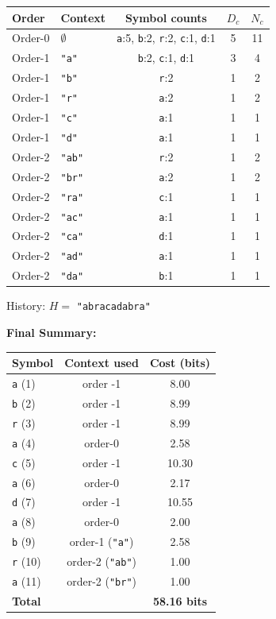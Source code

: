 \begin{examplebox}
\begin{center}
\footnotesize
\begin{tabular}{|l|l|c|c|c|}
\hline
\textbf{Order} & \textbf{Context} & \textbf{Symbol counts} & $D_c$ & $N_c$ \\
\hline
Order-0 & $\emptyset$ & \texttt{a}:5, \texttt{b}:2, \texttt{r}:2, \texttt{c}:1, \texttt{d}:1 & 5 & 11 \\
Order-1 & \texttt{"a"} & \texttt{b}:2, \texttt{c}:1, \texttt{d}:1 & 3 & 4 \\
Order-1 & \texttt{"b"} & \texttt{r}:2 & 1 & 2 \\
Order-1 & \texttt{"r"} & \texttt{a}:2 & 1 & 2 \\
Order-1 & \texttt{"c"} & \texttt{a}:1 & 1 & 1 \\
Order-1 & \texttt{"d"} & \texttt{a}:1 & 1 & 1 \\
Order-2 & \texttt{"ab"} & \texttt{r}:2 & 1 & 2 \\
Order-2 & \texttt{"br"} & \texttt{a}:2 & 1 & 2 \\
Order-2 & \texttt{"ra"} & \texttt{c}:1 & 1 & 1 \\
Order-2 & \texttt{"ac"} & \texttt{a}:1 & 1 & 1 \\
Order-2 & \texttt{"ca"} & \texttt{d}:1 & 1 & 1 \\
Order-2 & \texttt{"ad"} & \texttt{a}:1 & 1 & 1 \\
Order-2 & \texttt{"da"} & \texttt{b}:1 & 1 & 1 \\
\hline
\end{tabular}
\end{center}
History: $H =$ \texttt{"abracadabra"}

\bigskip
\textbf{Final Summary:}
\begin{center}
\begin{tabular}{l|c|c}
\textbf{Symbol} & \textbf{Context used} & \textbf{Cost (bits)} \\
\hline
\texttt{a} (1) & order -1 & 8.00 \\
\texttt{b} (2) & order -1 & 8.99 \\
\texttt{r} (3) & order -1 & 8.99 \\
\texttt{a} (4) & order-0 & 2.58 \\
\texttt{c} (5) & order -1 & 10.30 \\
\texttt{a} (6) & order-0 & 2.17 \\
\texttt{d} (7) & order -1 & 10.55 \\
\texttt{a} (8) & order-0 & 2.00 \\
\texttt{b} (9) & order-1 (\texttt{"a"}) & 2.58 \\
\texttt{r} (10) & order-2 (\texttt{"ab"}) & 1.00 \\
\texttt{a} (11) & order-2 (\texttt{"br"}) & 1.00 \\
\hline
\textbf{Total} & & \textbf{58.16 bits} \\
\end{tabular}
\end{center}


\end{examplebox}
